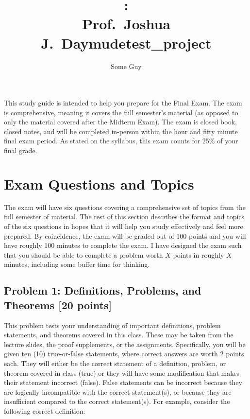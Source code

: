 \documentclass[10pt]{article}
\title{\large{\textbf{\course: \docname}\\
\smallskip
Prof.\ Joshua J.\ Daymude}}
\author{}
\date{\vspace{-15mm}}
\title{\large{\textbf{test\_project}}}
\author{Some Guy}
\date{}
\begin{document}
\maketitle




This study guide is intended to help you prepare for the Final Exam.
The exam is comprehensive, meaning it covers the full semester's material (as opposed to only the material covered after the Midterm Exam).
The exam is closed book, closed notes, and will be completed in-person within the hour and fifty minute final exam period.
As stated on the syllabus, this exam counts for 25\% of your final grade.




\section*{Exam Questions and Topics}

The exam will have six questions covering a comprehensive set of topics from the full semester of material.
The rest of this section describes the format and topics of the six questions in hopes that it will help you study effectively and feel more prepared.
By coincidence, the exam will be graded out of 100 points and you will have roughly 100 minutes to complete the exam.
I have designed the exam such that you should be able to complete a problem worth $X$ points in roughly $X$ minutes, including some buffer time for thinking.



\subsection*{Problem 1: Definitions, Problems, and Theorems [20 points]}

This problem tests your understanding of important definitions, problem statements, and theorems covered in this class.
These may be taken from the lecture slides, the proof supplements, or the assignments.
Specifically, you will be given ten (10) true-or-false statements, where correct answers are worth 2 points each.
They will either be the correct statement of a definition, problem, or theorem covered in class (true) or they will have some modification that makes their statement incorrect (false).
False statements can be incorrect because they are logically incompatible with the correct statement(s), or because they are insufficient compared to the correct statement(s).
For example, consider the following correct definition:
\end{document}
